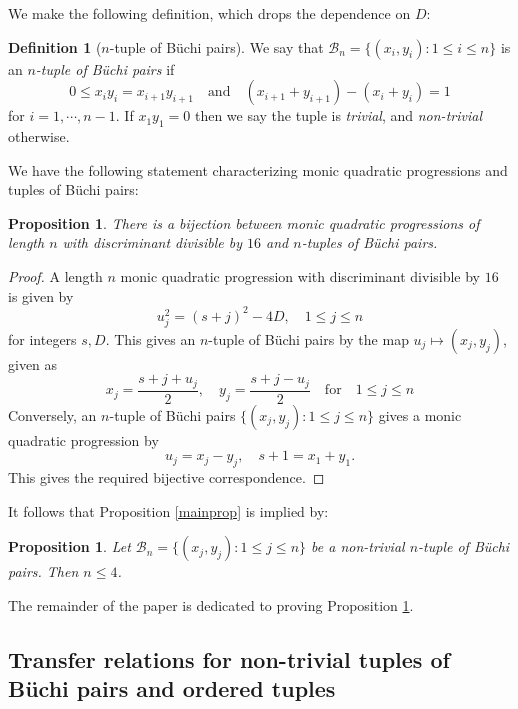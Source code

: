 \documentclass[letterpaper,10pt]{amsart}
\newcommand{\B}{{\mathcal{B}}}
\newtheorem{proposition}[theorem]{Proposition}
\theoremstyle{definition}
\newtheorem{definition}[theorem]{Definition}
\numberwithin{equation}{section}
\begin{document}
	We make the following definition, which drops the dependence on $D$:
	
	\begin{definition}[$n$-tuple of B\"{u}chi pairs] \label{buchim} We say that $\B_n = \{(x_i, y_i) : 1 \leq i \leq n\}$ is an \emph{$n$-tuple of B\"{u}chi pairs} if
	\begin{equation} \label{Buchituple3} 0 \leq x_i y_i = x_{i+1} y_{i+1} \quad \text{and} \quad (x_{i+1} + y_{i+1}) - (x_i + y_i) = 1
	\end{equation}
	for $i = 1, \cdots, n-1$. If $x_1 y_1 = 0$ then we say the tuple is \emph{trivial}, and \emph{non-trivial} otherwise. 
	\end{definition}
	
We have the following statement characterizing monic quadratic progressions and tuples of B\"{u}chi pairs:

\begin{proposition} \label{tprop1} There is a bijection between monic quadratic progressions of length $n$ with discriminant divisible by $16$ and $n$-tuples of B\"{u}chi pairs.
\end{proposition}

\begin{proof} A length $n$ monic quadratic progression with discriminant divisible by $16$ is given by 
\[u_j^2 = (s+j)^2 - 4D, \quad 1 \leq j \leq n\]
for integers $s, D$. This gives an $n$-tuple of B\"{u}chi pairs by the map $u_j \mapsto (x_j, y_j)$, given as
\[x_j = \frac{s + j + u_j}{2}, \quad y_j = \frac{s + j  - u_j}{2} \quad \text{for} \quad 1 \leq j \leq n\]
Conversely, an $n$-tuple of B\"{u}chi pairs $\{(x_j, y_j) : 1 \leq j \leq n\}$ gives a monic quadratic progression by 
\[u_j = x_j - y_j, \quad s + 1 = x_1 + y_1.\]
This gives the required bijective correspondence. \end{proof} 	

It follows that Proposition \ref{mainprop} is implied by: 

\begin{proposition} \label{mainprop2} Let $\B_n = \{(x_j, y_j) : 1 \leq j \leq n\}$ be a non-trivial $n$-tuple of B\"{u}chi pairs. Then $n \leq 4$. 
\end{proposition}

The remainder of the paper is dedicated to proving Proposition \ref{mainprop2}. 

\subsection{Transfer relations for non-trivial tuples of B\"{u}chi pairs and ordered tuples} 
	
\end{document}
